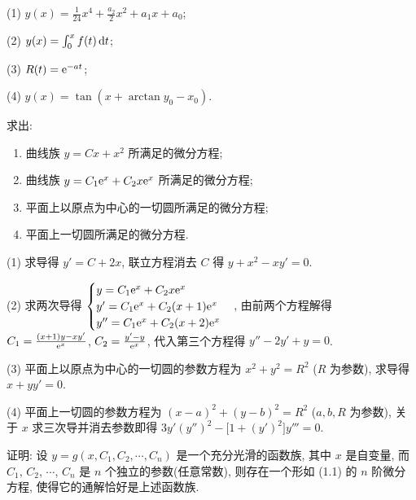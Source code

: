 \begin{solution}
  (1) $y(x)=\frac{1}{24}x^4+\frac{a_2}{2}x^2+a_1x+a_0$;

  (2) $y(x)=\int_0^xf(t)\mathop{}\!\mathrm{d} t$;

  (3) $R(t)=\mathrm{e}^{-at}$;

  (4) $y(x)=\tan(x+\arctan y_0-x_0)$.
\end{solution}



\begin{exercise}
  求出:
  \begin{enumerate}[(1)]
  \item 曲线族 $y=Cx+x^2$ 所满足的微分方程;
  \item 曲线族 $y=C_1\mathrm{e}^x+C_2x\mathrm{e}^x$ 所满足的微分方程;
  \item 平面上以原点为中心的一切圆所满足的微分方程;
  \item 平面上一切圆所满足的微分方程.
  \end{enumerate}
\end{exercise}

\begin{solution}
  (1) 求导得 $y'=C+2x$, 联立方程消去 $C$ 得 $y+x^2-xy'=0$.

  (2) 求两次导得
  $\begin{cases}y=C_1\mathrm{e}^x+C_2x\mathrm{e}^x\\y'=C_1\mathrm{e}^x+C_2(x+1)\mathrm{e}^x\\y''=C_1\mathrm{e}^x+C_2(x+2)\mathrm{e}^x\end{cases}$, 
  由前两个方程解得 $C_1=\frac{(x+1)y-xy'}{\mathrm{e}^x}$, $C_2=\frac{y'-y}{\mathrm{e}^x}$, 
  代入第三个方程得 $y''-2y'+y=0$.

  (3) 平面上以原点为中心的一切圆的参数方程为 $x^2+y^2=R^2$ ($R$ 为参数), 求导得 $x+yy'=0$.

  (4) 平面上一切圆的参数方程为 $(x-a)^2+(y-b)^2=R^2$ ($a,b,R$ 为参数),
  关于 $x$ 求三次导并消去参数即得 $3y'(y'')^2-\bigl[1+(y')^2\bigr]y'''=0$.
\end{solution}



\begin{exercise}
  证明: 设 $y=g(x,C_1,C_2,\cdots,C_n)$ 是一个充分光滑的函数族, 其中 $x$ 是自变量, 
  而 $C_1$, $C_2$, $\cdots$, $C_n$ 是 $n$ 个独立的参数(任意常数), 则存在一个形如 (1.1) 的 $n$ 阶微分方程, 
  使得它的通解恰好是上述函数族.
\end{exercise}

